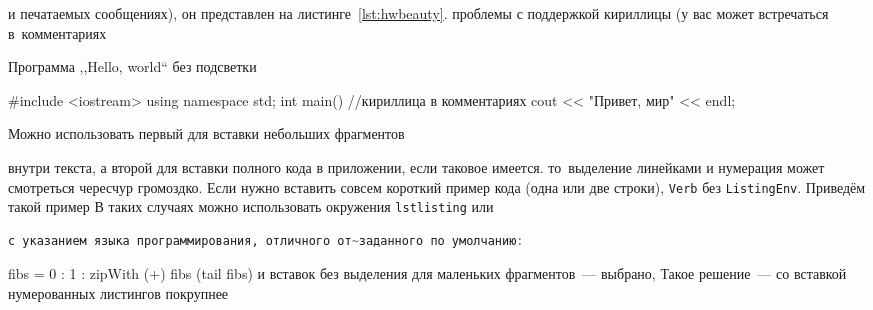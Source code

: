 и печатаемых сообщениях), он представлен на листинге~\ref{lst:hwbeauty}.
проблемы с поддержкой кириллицы (у вас может встречаться в~комментариях
\captiondelim{ } %
%
\captiondelim{ } %
\begin{ListingEnv}[!h]

    \caption{Программа ,,Hello, world`` без подсветки}\label{lst:hwplain}
    \begin{Verb}

        #include <iostream>
        using namespace std;
        {
        int main() //кириллица в комментариях
            }
            cout << "Привет, мир" << endl;
    
    \end{Verb}
\end{ListingEnv}Можно использовать первый для вставки небольших фрагментов


внутри текста, а второй для вставки полного
кода в приложении, если таковое имеется.
то~выделение  линейками и нумерация может смотреться чересчур громоздко.
Если нужно вставить совсем короткий пример кода (одна или две строки),
\texttt{Verb} без \texttt{ListingEnv}. Приведём такой пример
В таких случаях можно использовать окружения \texttt{lstlisting} или
\begin{lstlisting}[language=Haskell]
с указанием языка программирования, отличного от~заданного по умолчанию:
\end{lstlisting}
fibs = 0 : 1 : zipWith (+) fibs (tail fibs)
и вставок без выделения для маленьких фрагментов~--- выбрано,
Такое решение~--- со вставкой нумерованных листингов покрупнее

